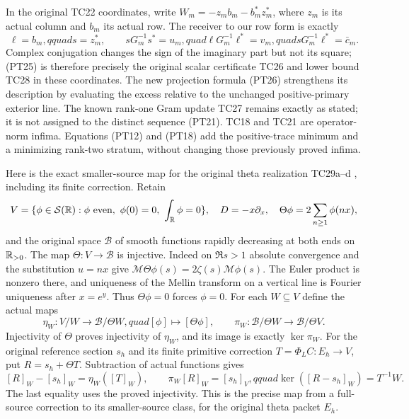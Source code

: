 \documentclass[11pt,a4paper]{article}
\begin{document}
In the original TC22 coordinates, write
\(W_m=-z_mb_m-b_m^*z_m^*\), where \(z_m\) is its actual
column and \(b_m\) its actual row. The receiver to our row form
is exactly
\begin{equation}\tag{PT32}
 \ell=b_m,qquad s=z_m^*,\qquad
 sG_m^{-1}s^*=u_m,quad \ell G_m^{-1}\ell^*=v_m,quad
 sG_m^{-1}\ell^*=\bar c_m.
\end{equation}
Complex conjugation changes the sign of the imaginary part but
not its square; (PT25) is therefore precisely the original scalar
certificate TC26 and lower bound TC28 in these coordinates. The
new projection formula (PT26) strengthens its description by
evaluating the excess relative to the unchanged positive-primary
exterior line. The known rank-one Gram update TC27 remains exactly
as stated; it is not assigned to the distinct sequence (PT21).
TC18 and TC21 are operator-norm infima. Equations (PT12) and
(PT18) add the positive-trace minimum and a minimizing rank-two
stratum, without changing those previously proved infima.

Here is the exact smaller-source map for the original theta
realization TC29a--d \cite{a03pt:tc}, including its finite correction.
Retain
\[
 V=\{\phi\in\mathcal S(\mathbb R):\phi\text{ even},\ \phi(0)=0,
                 \ \int_\mathbb R\phi=0\},\quad D=-x\partial_x,
 \quad\Theta\phi=2\sum_{n\ge1}\phi(nx),
\]
and the original space \(\mathscr B\) of smooth functions rapidly
decreasing at both ends on \(\mathbb R_{>0}\). The map \(\Theta:V\to
\mathscr B\) is injective. Indeed on \(\Re s>1\) absolute
convergence and the substitution \(u=nx\) give
\(\mathcal M\Theta\phi(s)=2\zeta(s)\mathcal M\phi(s)\).
The Euler product is nonzero there, and uniqueness of the Mellin
transform on a vertical line is Fourier uniqueness after \(x=e^y\).
Thus \(\Theta\phi=0\) forces \(\phi=0\).
For each \(W\subseteq V\) define the actual maps
\[
 \eta_W:V/W\longrightarrow\mathscr B/\Theta W,quad
 [\phi]\longmapsto[\Theta\phi],\qquad
 \pi_W:\mathscr B/\Theta W\longrightarrow\mathscr B/\Theta V.
\]
Injectivity of \(\Theta\) proves injectivity of \(\eta_W\),
and its image is exactly \(\ker\pi_W\). For the original
reference section \(s_h\) and its finite primitive correction
\(T=\Phi_LC:E_h\to V\), put \(R=s_h+\Theta T\). Subtraction
of actual functions gives
\begin{equation}\tag{PT33}
 [R]_W-[s_h]_W=\eta_W([T]_W),\qquad
 \pi_W[R]_W=[s_h]_V,qquad
 \ker([R-s_h]_W)=T^{-1}W.
\end{equation}
The last equality uses the proved injectivity. This is the
precise map from a full-source correction to its smaller-source
class, for the original theta packet \(E_h\).
\end{document}
